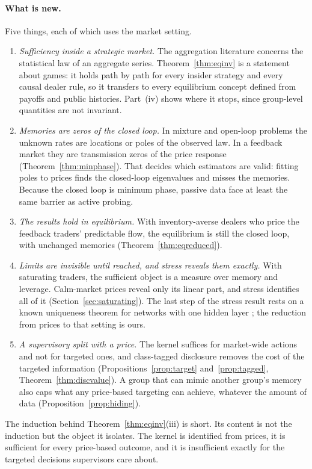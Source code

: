 \paragraph{What is new.} Five things, each of which uses the market setting.
\begin{enumerate}[label=(\alph*),leftmargin=*,itemsep=2pt]
\item \emph{Sufficiency inside a strategic market.} The aggregation literature concerns the statistical law of an aggregate series. Theorem~\ref{thm:eqinv} is a statement about games: it holds path by path for every insider strategy and every causal dealer rule, so it transfers to every equilibrium concept defined from payoffs and public histories. Part~(iv) shows where it stops, since group-level quantities are not invariant.
\item \emph{Memories are zeros of the closed loop.} In mixture and open-loop problems the unknown rates are locations or poles of the observed law. In a feedback market they are transmission zeros of the price response (Theorem~\ref{thm:minphase}). That decides which estimators are valid: fitting poles to prices finds the closed-loop eigenvalues and misses the memories. Because the closed loop is minimum phase, passive data face at least the same barrier as active probing.
\item \emph{The results hold in equilibrium.} With inventory-averse dealers who price the feedback traders' predictable flow, the equilibrium is still the closed loop, with unchanged memories (Theorem~\ref{thm:eqreduced}).
\item \emph{Limits are invisible until reached, and stress reveals them exactly.} With saturating traders, the sufficient object is a measure over memory and leverage. Calm-market prices reveal only its linear part, and stress identifies all of it (Section~\ref{sec:saturating}). The last step of the stress result rests on a known uniqueness theorem for networks with one hidden layer \citep{sussmann1992}; the reduction from prices to that setting is ours.
\item \emph{A supervisory split with a price.} The kernel suffices for market-wide actions and not for targeted ones, and class-tagged disclosure removes the cost of the targeted information (Propositions~\ref{prop:target} and~\ref{prop:tagged}, Theorem~\ref{thm:discvalue}). A group that can mimic another group's memory also caps what any price-based targeting can achieve, whatever the amount of data (Proposition~\ref{prop:hiding}).
\end{enumerate}
The induction behind Theorem~\ref{thm:eqinv}(iii) is short. Its content is not the induction but the object it isolates. The kernel is identified from prices, it is sufficient for every price-based outcome, and it is insufficient exactly for the targeted decisions supervisors care about.

